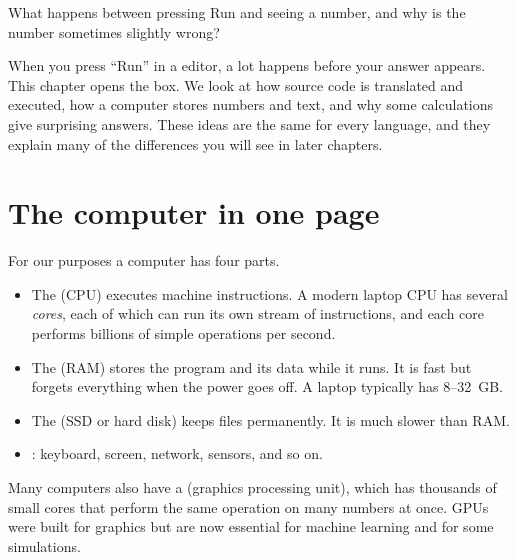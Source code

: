 \label{ch:howcoderuns}

\begin{researchquestion}
What happens between pressing Run and seeing a number, and why is the number sometimes slightly wrong?
\end{researchquestion}

When you press ``Run'' in a \py editor, a lot happens before your answer appears. This
chapter opens the box. We look at how source code is translated and executed, how a
computer stores numbers and text, and why some calculations give surprising answers.
These ideas are the same for every language, and they explain many of the differences
you will see in later chapters.


\section{The computer in one page}

For our purposes a computer has four parts.
\begin{itemize}
\item The  (CPU) executes machine instructions. A modern laptop CPU has
  several \emph{cores}, each of which can run its own stream of instructions, and each
  core performs billions of simple operations per second.
\item The  (RAM) stores the program and its data while it runs. It is fast
  but forgets everything when the power goes off. A laptop typically has 8--32~GB.
\item The  (SSD or hard disk) keeps files permanently. It is much slower
  than RAM.
\item {}: keyboard, screen, network, sensors, and so on.
\end{itemize}
Many computers also have a  (graphics processing unit), which has thousands of
small cores that perform the same operation on many numbers at once. GPUs were built for
graphics but are now essential for machine learning and for some simulations.

